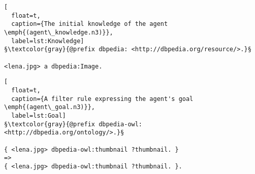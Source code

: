  \begin{lstlisting}[
  float=t,
  caption={The initial knowledge of the agent \emph{(agent\_knowledge.n3)}},
  label=lst:Knowledge]
§\textcolor{gray}{@prefix dbpedia: <http://dbpedia.org/resource/>.}§

<lena.jpg> a dbpedia:Image.
\end{lstlisting}

\begin{lstlisting}[
  float=t,
  caption={A filter rule expressing the agent's goal \emph{(agent\_goal.n3)}},
  label=lst:Goal]
§\textcolor{gray}{@prefix dbpedia-owl: <http://dbpedia.org/ontology/>.}§

{ <lena.jpg> dbpedia-owl:thumbnail ?thumbnail. }
=>
{ <lena.jpg> dbpedia-owl:thumbnail ?thumbnail. }.
\end{lstlisting}


